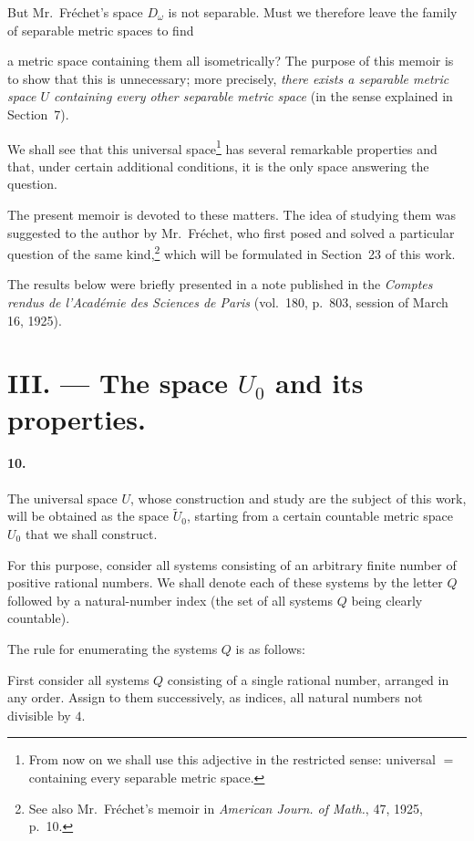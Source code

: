 \documentclass[a4paper,12pt]{amsart}
\newcommand{\srcpage}[1]{} %
\begin{document}
But Mr.~Fréchet's space $D_\omega$ is not separable. Must we therefore leave the family of separable metric spaces to find
\srcpage{52}
a metric space containing them all isometrically? The purpose of this memoir is to show that this is unnecessary; more precisely, \textit{there exists a separable metric space $U$ containing every other separable metric space} (in the sense explained in Section~7).

We shall see that this universal space\footnote{From now on we shall use this adjective in the restricted sense: universal $=$ containing every separable metric space.}
has several remarkable properties and that, under certain additional conditions, it is the only space answering the question.

The present memoir is devoted to these matters. The idea of studying them was suggested to the author by Mr.~Fréchet, who first posed and solved a particular question of the same kind,\footnote{See also Mr.~Fréchet's memoir in \textit{American Journ. of Math.}, 47, 1925, p.~10.}
which will be formulated in Section~23 of this work.

The results below were briefly presented in a note published in the \textit{Comptes rendus de l'Académie des Sciences de Paris} (vol.~180, p.~803, session of March 16, 1925).

\section*{III. --- The space $U_0$ and its properties.}
\paragraph{10.}
The universal space $U$, whose construction and study are the subject of this work, will be obtained as the space $\widetilde{U}_0$, starting from a certain countable metric space $U_0$ that we shall construct.

For this purpose, consider all systems consisting of an arbitrary finite number of positive rational numbers. We shall denote each of these systems by the letter $Q$ followed by a natural-number index (the set of all systems $Q$ being clearly countable).

The rule for enumerating the systems $Q$ is as follows:

First consider all systems $Q$ consisting of a single rational number, arranged in any order. Assign to them successively, as indices, all natural numbers not divisible by $4$.
\srcpage{53}
\end{document}
